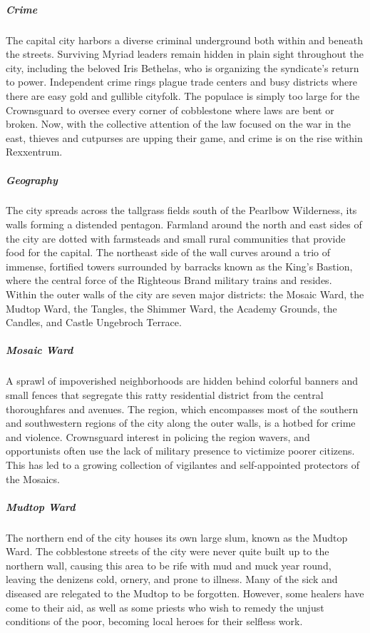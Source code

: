 \documentclass[10pt,a4paper,twoside,bg=print,twocolumn,openany,nodeprecatedcode]{dndbook}
\begin{document}
\subparagraph{Crime}
The capital city harbors a diverse criminal underground both within and beneath the streets. Surviving Myriad leaders remain hidden in plain sight throughout the city, including the beloved Iris Bethelas, who is organizing the syndicate's return to power. Independent crime rings plague trade centers and busy districts where there are easy gold and gullible cityfolk. The populace is simply too large for the Crownsguard to oversee every corner of cobblestone where laws are bent or broken. Now, with the collective attention of the law focused on the war in the east, thieves and cutpurses are upping their game, and crime is on the rise within Rexxentrum.

\subparagraph{Geography}
The city spreads across the tallgrass fields south of the Pearlbow Wilderness, its walls forming a distended pentagon. Farmland around the north and east sides of the city are dotted with farmsteads and small rural communities that provide food for the capital. The northeast side of the wall curves around a trio of immense, fortified towers surrounded by barracks known as the King's Bastion, where the central force of the Righteous Brand military trains and resides. Within the outer walls of the city are seven major districts: the Mosaic Ward, the Mudtop Ward, the Tangles, the Shimmer Ward, the Academy Grounds, the Candles, and Castle Ungebroch Terrace.

\subparagraph{Mosaic Ward}
A sprawl of impoverished neighborhoods are hidden behind colorful banners and small fences that segregate this ratty residential district from the central thoroughfares and avenues. The region, which encompasses most of the southern and southwestern regions of the city along the outer walls, is a hotbed for crime and violence. Crownsguard interest in policing the region wavers, and opportunists often use the lack of military presence to victimize poorer citizens. This has led to a growing collection of vigilantes and self-appointed protectors of the Mosaics.

\subparagraph{Mudtop Ward}
The northern end of the city houses its own large slum, known as the Mudtop Ward. The cobblestone streets of the city were never quite built up to the northern wall, causing this area to be rife with mud and muck year round, leaving the denizens cold, ornery, and prone to illness. Many of the sick and diseased are relegated to the Mudtop to be forgotten. However, some healers have come to their aid, as well as some priests who wish to remedy the unjust conditions of the poor, becoming local heroes for their selfless work.
\end{document}

